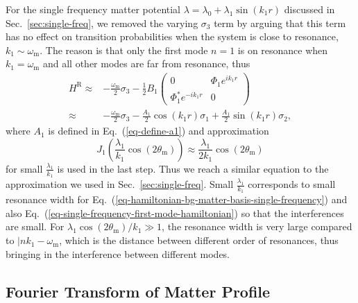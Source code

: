 \documentclass[%
reprint,
 amsmath,amssymb,
 aps,
]{revtex4-1}
\begin{document}
For the single frequency matter potential $\lambda = \lambda_0 + \lambda_1 \sin(k_1 r)$ discussed in Sec.~\ref{sec:single-freq}, we removed the varying $\sigma_3$ term by arguing that this term has no effect on transition probabilities when the system is close to resonance, $k_1 \sim \omega_{\mathrm m}$. The reason is that only the first mode $n=1$ is on resonance when $k_1=\omega_{\mathrm m}$ and all other modes are far from resonance, thus
\begin{align}
H^{\mathrm R} \approx & -\frac{\omega_{\mathrm m}}{2}\sigma_3 - \frac{1}{2} B_1 \begin{pmatrix}
0 & \Phi_1 e^{i k_1 r} \\
\Phi_1^* e^{-ik_1r} & 0
\end{pmatrix}\label{eq-single-frequency-first-mode-hamiltonian} \\
\approx & -\frac{\omega_{\mathrm m}}{2} \sigma_3 - \frac{A_1}{2} \cos(k_1 r) \sigma_1 + \frac{A_1}{2} \sin(k_1 r) \sigma_2\nonumber,
\end{align}
where $A_1$ is defined in Eq.~(\ref{eq-define-a1}) and approximation
\begin{equation*}
J_1\left( \frac{\lambda_1}{k_1}\cos (2\theta_{\mathrm m}) \right) \approx \frac{\lambda_1}{2k_1}\cos (2\theta_{\mathrm m})
\end{equation*}
for small $\frac{\lambda_1}{k_1}$ is used in the last step. Thus we reach a similar equation to the approximation we used in Sec.~\ref{sec:single-freq}. Small $\frac{\lambda_1}{k_1}$ corresponds to small resonance width for Eq.~(\ref{eq-hamiltonian-bg-matter-basis-single-frequency}) and also Eq.~(\ref{eq-single-frequency-first-mode-hamiltonian}) so that the interferences are small. For $\lambda_1 \cos(2\theta_{\mathrm{m}})/k_1\gg 1$, the resonance width is very large compared to $\lvert n k_1 - \omega_{\mathrm{m}}$, which is the distance between different order of resonances, thus bringing in the interference between different modes.





\subsection{Fourier Transform of Matter Profile}
\end{document}
